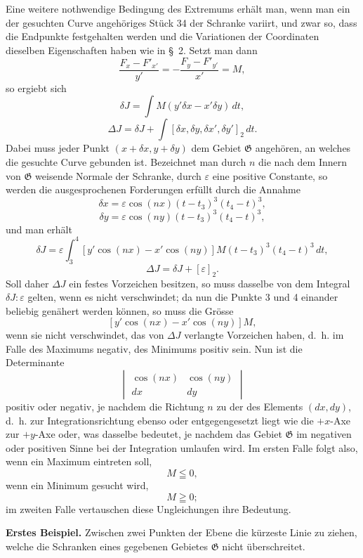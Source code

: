 \documentclass[11pt,a4paper,leqno]{article}
\begin{document}
Eine weitere nothwendige Bedingung des Extremums erhält man, wenn man ein der gesuchten Curve angehöriges Stück 34 der Schranke variirt, und zwar so, dass die Endpunkte festgehalten werden und die Variationen der Coordinaten dieselben Eigenschaften haben wie in \S~2. Setzt man dann
\[
\frac{F_x-F'_{x'}}{y'}=-\frac{F_y-F'_{y'}}{x'}=M,
\]
so ergiebt sich
\[
\delta J=\int M(y'\delta x-x'\delta y)\,dt,
\]
\[
\Delta J=\delta J+\int[\delta x,\delta y,\delta x',\delta y']_2\,dt.
\]
Dabei muss jeder Punkt $(x+\delta x,y+\delta y)$ dem Gebiet $\mathfrak{G}$ angehören, an welches die gesuchte Curve gebunden ist. Bezeichnet man durch $n$ die nach dem Innern von $\mathfrak{G}$ weisende Normale der Schranke, durch $\varepsilon$ eine positive Constante, so werden die ausgesprochenen Forderungen erfüllt durch die Annahme
\[
\delta x=\varepsilon\cos(nx)(t-t_3)^3(t_4-t)^3,
\]
\[
\delta y=\varepsilon\cos(ny)(t-t_3)^3(t_4-t)^3,
\]
und man erhält
\[
\delta J=\varepsilon\int_3^4 [y'\cos(nx)-x'\cos(ny)]M(t-t_3)^3(t_4-t)^3\,dt,
\]
\[
\Delta J=\delta J+[\varepsilon]_2.
\]
Soll daher $\Delta J$ ein festes Vorzeichen besitzen, so muss dasselbe von dem Integral $\delta J:\varepsilon$ gelten, wenn es nicht verschwindet; da nun die Punkte 3 und 4 einander beliebig genähert werden können, so muss die Grösse
\[
[y'\cos(nx)-x'\cos(ny)]M,
\]
wenn sie nicht verschwindet, das von $\Delta J$ verlangte Vorzeichen haben, d.~h. im Falle des Maximums negativ, des Minimums positiv sein. Nun ist die Determinante
\[
\begin{vmatrix}
\cos(nx)&\cos(ny)\\
dx&dy
\end{vmatrix}
\]
positiv oder negativ, je nachdem die Richtung $n$ zu der des Elements $(dx,dy)$, d.~h. zur Integrationsrichtung ebenso oder
entgegengesetzt liegt wie die $+x$-Axe zur $+y$-Axe oder, was dasselbe bedeutet, je nachdem das Gebiet $\mathfrak{G}$ im negativen oder positiven Sinne bei der Integration umlaufen wird. Im ersten Falle folgt also, wenn ein Maximum eintreten soll,
\[
M\leqq 0,
\]
wenn ein Minimum gesucht wird,
\[
M\geqq 0;
\]
im zweiten Falle vertauschen diese Ungleichungen ihre Bedeutung.

\textbf{Erstes Beispiel.} Zwischen zwei Punkten der Ebene die kürzeste Linie zu ziehen, welche die Schranken eines gegebenen Gebietes $\mathfrak{G}$ nicht überschreitet.
\end{document}
